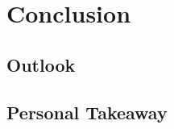 \chapter{Conclusion}
\lipsum[1]

\section{Outlook}
\lipsum[1]

\section{Personal Takeaway}
\lipsum[1]
